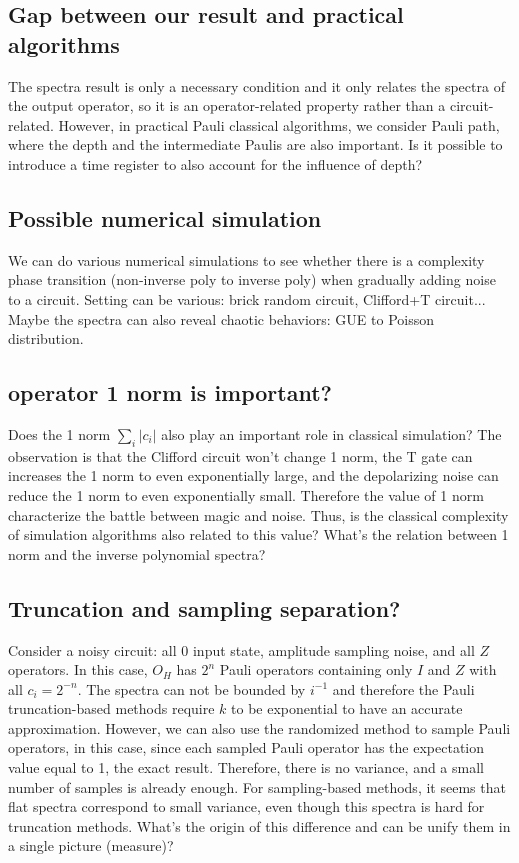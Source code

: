 \documentclass[showpacs,amsmath,amssymb,twocolumn,superscriptaddress,notitlepage,preprintnumbers,aps,pra,10pt,floatfix]{revtex4-2}
\begin{document}
\subsection{Gap between our result and practical algorithms}
The spectra result is only a necessary condition and it only relates the spectra of the output operator, so it is an operator-related property rather than a circuit-related. However, in practical Pauli classical algorithms, we consider Pauli path, where the depth and the intermediate Paulis are also important. Is it possible to introduce a time register to also account for the influence of depth?

\subsection{Possible numerical simulation}
We can do various numerical simulations to see whether there is a complexity phase transition (non-inverse poly to inverse poly) when gradually adding noise to a circuit. Setting can be various: brick random circuit, Clifford+T circuit...
Maybe the spectra can also reveal chaotic behaviors: GUE to Poisson distribution.

\subsection{operator 1 norm is important?}
Does the 1 norm $\sum_i |c_i|$ also play an important role in classical simulation? The observation is that the Clifford circuit won't change 1 norm, the T gate can increases the 1 norm to even exponentially large, and the depolarizing noise can reduce the 1 norm to even exponentially small. Therefore the value of 1 norm characterize the battle between magic and noise. Thus, is the classical complexity of simulation algorithms also related to this value? What's the relation between 1 norm and the inverse polynomial spectra?

\subsection{Truncation and sampling separation?}
Consider a noisy circuit: all 0 input state, amplitude sampling noise, and all $Z$ operators. In this case, $O_H$ has $2^n$ Pauli operators containing only $I$ and $Z$ with all $c_i=2^{-n}$. The spectra can not be bounded by $i^{-1}$ and therefore the Pauli truncation-based methods require $k$ to be exponential to have an accurate approximation. However, we can also use the randomized method to sample Pauli operators, in this case, since each sampled Pauli operator has the expectation value equal to 1, the exact result. Therefore, there is no variance, and a small number of samples is already enough. For sampling-based methods, it seems that flat spectra correspond to small variance, even though this spectra is hard for truncation methods. What's the origin of this difference and can be unify them in a single picture (measure)? 
\end{document}
